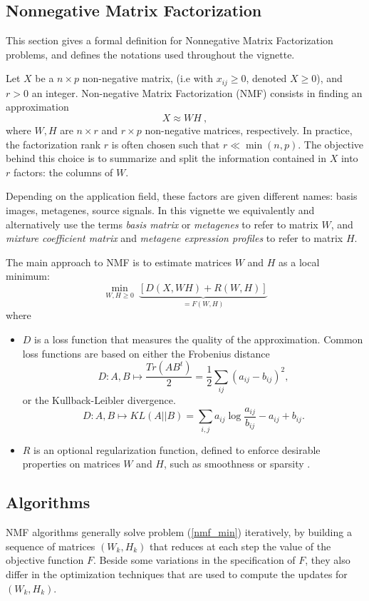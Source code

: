 \documentclass[a4paper]{article}\usepackage{graphicx, color}
\newcommand{\refeqn}[1]{(\ref{#1})}
\renewcommand{\cite}[1]{\parencite{#1}}
\begin{document}
\subsection{Nonnegative Matrix Factorization}

This section gives a formal definition for Nonnegative Matrix Factorization problems, and defines the notations used throughout the vignette. 

Let $X$ be a $n \times p$ non-negative matrix, (i.e with $x_{ij} \geq 0$,
denoted $X \geq 0$), and $r > 0$ an integer. Non-negative Matrix Factorization (NMF) consists in finding an approximation
\begin{equation}
X \approx W H\ , \label{NMFstd}
\end{equation}
where $W, H$ are $n\times r$ and $r \times p$ non-negative matrices, respectively. 
In practice, the factorization rank $r$ is often chosen such that $r \ll \min(n, p)$. 
The objective behind this choice is to summarize and split the information contained in $X$ into $r$ factors: the columns of $W$. 

Depending on the application field, these factors are given different names: basis images, metagenes, source signals. In this vignette we equivalently and alternatively use the terms 
\emph{basis matrix} or \emph{metagenes} to refer to matrix $W$, and \emph{mixture coefficient matrix} and \emph{metagene expression profiles} to refer to matrix $H$.

The main approach to NMF is to estimate matrices $W$ and $H$ as a local minimum:
\begin{equation}
\min_{W, H \geq 0}\ \underbrace{[D(X, WH) + R(W, H)]}_{=F(W,H)} \label{nmf_min}
\end{equation}
where 

\begin{itemize}
\item $D$ is a loss function that measures the quality of the approximation. 
Common loss functions are based on either the Frobenius distance 
$$D: A,B\mapsto \frac{Tr(AB^t)}{2} = \frac{1}{2} \sum_{ij} (a_{ij} - b_{ij})^2,$$
or the Kullback-Leibler divergence.
$$D: A,B\mapsto KL(A||B) = \sum_{i,j} a_{ij} \log \frac{a_{ij}}{b_{ij}} - a_{ij} + b_{ij}.$$
\item $R$ is an optional regularization function, defined to enforce desirable
properties on matrices $W$ and $H$, such as smoothness or sparsity
\cite{Cichocki2008}.
\end{itemize}

\subsection{Algorithms}
NMF algorithms generally solve problem \refeqn{nmf_min} iteratively, by building a sequence of matrices $(W_k,H_k)$ that reduces at each step the value of the objective function $F$.
Beside some variations in the specification of $F$, they also differ in the optimization techniques that are used to compute the updates for $(W_k,H_k)$.
\end{document}
